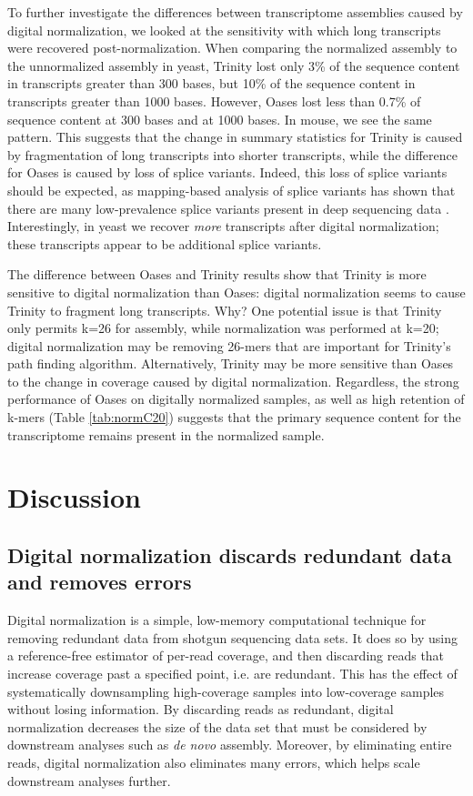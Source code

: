 \documentclass[10pt]{article}
\begin{document}
To further investigate the differences between transcriptome
assemblies caused by digital normalization, we looked at the
sensitivity with which long transcripts were recovered
post-normalization.  When comparing the normalized assembly to the
unnormalized assembly in yeast, Trinity lost only 3\% of the sequence
content in transcripts greater than 300 bases, but 10\% of the
sequence content in transcripts greater than 1000 bases.  However,
Oases lost less than 0.7\% of sequence content at 300 bases and at
1000 bases.  In mouse, we see the same pattern.
This suggests that the change in summary statistics for
Trinity is caused by fragmentation of long transcripts into shorter
transcripts, while the difference for Oases is caused by loss of
splice variants.  Indeed, this
loss of splice variants should be expected, as mapping-based analysis
of splice variants has shown that there are many low-prevalence splice
variants present in deep sequencing data \cite{pubmed21151575}.
Interestingly, in yeast we recover {\em more} transcripts after
digital normalization; these transcripts appear to be additional splice
variants.


The difference between Oases and Trinity results show that Trinity is
more sensitive to digital normalization than Oases: digital
normalization seems to cause Trinity to fragment long transcripts.
Why?  One potential issue is that Trinity only permits k=26 for
assembly, while normalization was performed at k=20; digital
normalization may be removing 26-mers that are important for Trinity's
path finding algorithm.  Alternatively, Trinity may be more sensitive
than Oases to the change in coverage caused by digital normalization.
Regardless, the strong performance of Oases on digitally normalized
samples, as well as high retention of k-mers (Table \ref{tab:normC20})
suggests that the primary sequence content for the transcriptome remains
present in the normalized sample.

\section*{Discussion}

\subsection*{Digital normalization discards redundant data and removes errors}

Digital normalization is a simple, low-memory computational technique
for removing redundant data from shotgun sequencing data sets.  It
does so by using a reference-free estimator of per-read coverage, and
then discarding reads that increase coverage past a specified point,
i.e. are redundant.  This has the effect of systematically
downsampling high-coverage samples into low-coverage samples without
losing information.  By discarding reads as redundant, digital normalization decreases the
size of the data set that must be considered by downstream analyses
such as {\em de novo} assembly.  Moreover, by eliminating entire reads,
digital normalization
also eliminates many errors, which helps scale downstream analyses
further.
\end{document}
